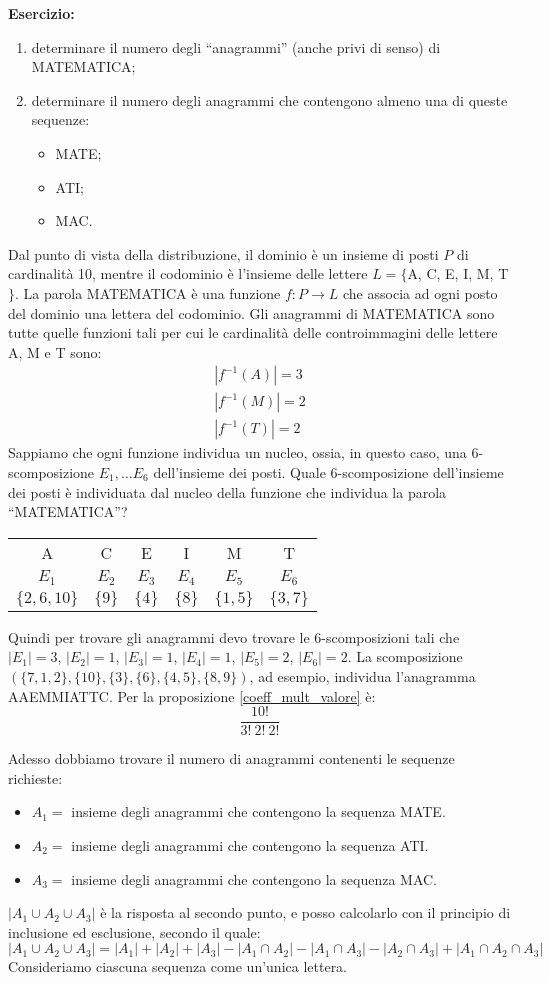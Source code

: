 \textbf{Esercizio:} 
\begin{enumerate}
  \item determinare il numero degli ``anagrammi'' (anche privi di senso) di MATEMATICA;
  \item determinare il numero degli anagrammi che contengono almeno una di queste sequenze:
  \begin{itemize}
    \item MATE;
    \item ATI;
    \item MAC.
  \end{itemize}
\end{enumerate}

Dal punto di vista della distribuzione, il dominio \`e un insieme di posti $P$ di cardinalit\`a 10, mentre il codominio \`e l'insieme delle lettere $L = \{ $A, C, E, I, M, T$\}$. La parola MATEMATICA \`e una funzione $f : P \to L $ che associa ad ogni posto del dominio una lettera del codominio. Gli anagrammi di MATEMATICA sono tutte quelle funzioni tali per cui le cardinalit\`a delle controimmagini delle lettere A, M e T sono: 
\begin{align*}
|f^{-1}(A)| = 3 \\ 
|f^{-1}(M)| = 2 \\
|f^{-1}(T)| = 2
\end{align*}
Sappiamo che ogni funzione individua un nucleo, ossia, in questo caso, una $6$-scomposizione $E_1, \dots E_6$ dell'insieme dei posti. Quale $6$-scomposizione dell'insieme dei posti \`e individuata dal nucleo della funzione che individua la parola ``MATEMATICA''?

\begin{tabular}{c|c|c|c|c|c}
A & C & E & I & M & T \\
$E_1$ & $E_2$ & $E_3$ & $E_4$ & $E_5$ & $E_6$ \\
$\{2, 6, 10\}$ & $\{9\}$ & $\{4\}$ & $\{8\}$ & $\{1,5\}$ & $\{3,7\}$ 
\end{tabular}

Quindi per trovare gli anagrammi devo trovare le $6$-scomposizioni tali che $|E_1| = 3$, $|E_2| = 1$, $|E_3| = 1$, $|E_4| = 1$, $|E_5| = 2$, $|E_6| = 2$. La scomposizione $( \{ 7, 1, 2\}, \{ 10\}, \{3\}, \{ 6\}, \{4, 5\}, \{8,9\})$, ad esempio, individua l'anagramma AAEMMIATTC. Per la proposizione \ref{coeff_mult_valore} \`e:
\[
\frac{10!}{3! \ 2! \ 2!}
\]

Adesso dobbiamo trovare il numero di anagrammi contenenti le sequenze richieste:
\begin{itemize}
  \item $A_1 = $ insieme degli anagrammi che contengono la sequenza MATE.
  \item $A_2 = $ insieme degli anagrammi che contengono la sequenza ATI.
  \item $A_3 = $ insieme degli anagrammi che contengono la sequenza MAC.
\end{itemize}
$|A_1 \cup A_2 \cup A_3|$ \`e la risposta al secondo punto, e posso calcolarlo con il principio di inclusione ed esclusione, secondo il quale:
\[
|A_1 \cup A_2 \cup A_3| = |A_1| + |A_2| + |A_3| - |A_1 \cap A_2| - |A_1 \cap A_3| - |A_2 \cap A_3| + |A_1 \cap A_2 \cap A_3|
\]
Consideriamo ciascuna sequenza come un'unica lettera. 

